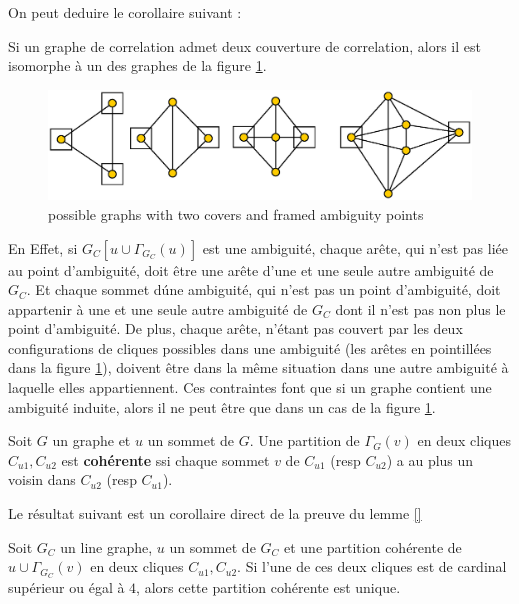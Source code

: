 On peut deduire le corollaire suivant :
\begin{corollary}
Si un graphe de correlation admet deux couverture de correlation, alors il est isomorphe \`a un des graphes de la figure  \ref{graphe2Couverture}.
\end{corollary}
\begin{centering} \vspace{-0.5em}
\begin{figure}[htb!] \vspace{-0.5em}
\includegraphics[scale=0.45]{./imagesLineGraphes/graphe2Couverture.eps}
\caption{ possible graphs with two covers and framed ambiguity points }
\label{graphe2Couverture} 
\end{figure}
\end{centering} 
En Effet, si $G_C[{u} \cup \Gamma_{G_C}(u)]$ est une ambiguit\'e, chaque ar\^ete, qui n'est pas li\'ee au point d'ambiguit\'e, doit \^etre une ar\^ete d'une et une seule autre ambiguit\'e de $G_C$. Et chaque sommet d\'une ambiguit\'e, qui n'est pas un point d'ambiguit\'e, doit appartenir \`a une et une seule autre ambiguit\'e de $G_C$ dont il n'est pas non  plus le point d'ambiguit\'e.
De plus, chaque ar\^ete, n'\'etant pas couvert par les deux configurations de cliques possibles dans une ambiguit\'e (les ar\^etes en pointill\'ees dans la figure \ref{graphe2Couverture}), doivent \^etre dans la m\^eme situation dans une autre ambiguit\'e \`a laquelle elles appartiennent.
Ces contraintes font que si un graphe contient une ambiguit\'e induite, alors il ne peut \^etre que dans un cas de la figure  \ref{graphe2Couverture}.

\begin{definition}
Soit $G$ un graphe et $u$ un sommet de $G$. Une partition de $\Gamma_G(v)$ en deux cliques $C_{u1}, C_{u2}$ est {\bf coh\'erente } ssi chaque sommet $v$ de $C_{u1}$ (resp $C_{u2}$) a au plus un voisin dans $C_{u2}$  (resp $C_{u1}$).
\end{definition}
Le r\'esultat suivant est un corollaire direct de la preuve du lemme \ref{}
\begin{lemma}
Soit $G_C$ un line graphe, $u$ un sommet de $G_C$ et une partition coh\'erente de ${u} \cup \Gamma_{G_C}(v)$ en deux cliques  $C_{u1}, C_{u2}$. 
Si l'une de ces deux cliques est de cardinal sup\'erieur ou \'egal \`a $4$, alors cette partition coh\'erente est unique.
\end{lemma}

